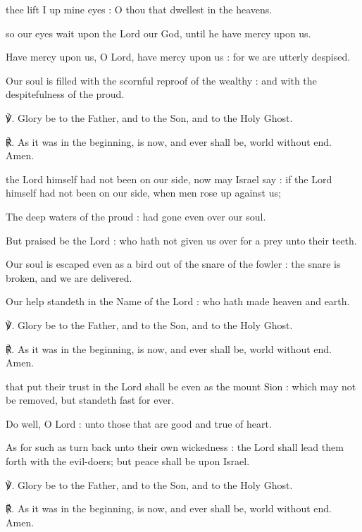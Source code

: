 \begin{multicols}{2}
 thee lift I up mine eyes : O thou that dwellest in the heavens.\par
{}
\noindent
so our eyes wait upon the Lord our God, until he have mercy upon us.\par
{}Have mercy upon us, O Lord, have mercy upon us : for we are utterly despised.\par
{}Our soul is filled with the scornful reproof of the wealthy : and with the despitefulness of the proud.\par
℣. Glory be to the Father, and to the Son, and to the Holy Ghost.\par
℟. As it was in the beginning, is now, and ever shall be, world without end. Amen.

 the Lord himself had not been on our side, now may Israel say : if the Lord himself had not been on our side, when men rose up against us;\par
{}
The deep waters of the proud : had gone even over our soul.\par
{}But praised be the Lord : who hath not given us over for a prey unto their teeth.\par
{}Our soul is escaped even as a bird out of the snare of the fowler : the snare is broken, and we are delivered.\par
{}Our help standeth in the Name of the Lord : who hath made heaven and earth.\par
℣. Glory be to the Father, and to the Son, and to the Holy Ghost.\par
℟. As it was in the beginning, is now, and ever shall be, world without end. Amen.

 that put their trust in the Lord shall be even as the mount Sion : which may not be removed, but standeth fast for ever.\par
{}
Do well, O Lord : unto those that are good and true of heart.\par
{}As for such as turn back unto their own wickedness : the Lord shall lead them forth with the evil-doers; but peace shall be upon Israel.\par
℣. Glory be to the Father, and to the Son, and to the Holy Ghost.\par
℟. As it was in the beginning, is now, and ever shall be, world without end. Amen.


\end{multicols}
